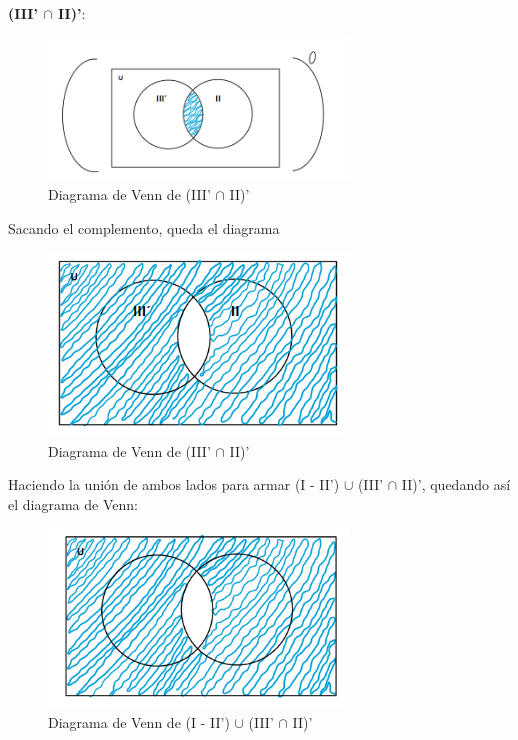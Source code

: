 \newpage

\textbf{(III' $\cap$ II)'}:

\begin{figure}[htbp]
\centering
\includegraphics[width=8cm]{a/bb.png}
\caption[]{Diagrama de Venn de (III' $\cap$ II)'}
\end{figure} 

Sacando el complemento, queda el diagrama

\begin{figure}[htbp]
\centering
\includegraphics[width=8cm]{a/bbb.png}
\caption[]{Diagrama de Venn de (III' $\cap$ II)'}
\end{figure} 

Haciendo la unión de ambos lados para armar (I - II') $\cup$ (III' $\cap$ II)', quedando así el diagrama de Venn:

\begin{figure}[htbp]
\centering
\includegraphics[width=8cm]{a/aabb.png}
\caption[]{Diagrama de Venn de (I - II') $\cup$ (III' $\cap$ II)'}
\end{figure} 
